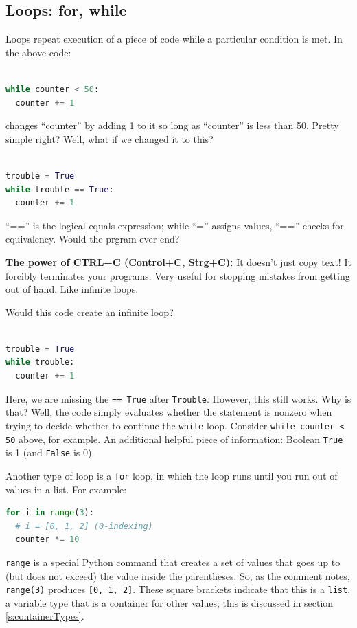 \documentclass[a4paper,10pt]{scrartcl}
\begin{document}
\subsection{Loops: for, while}
\label{s:loops}

Loops repeat execution of a piece of code while a particular condition is met. In the above code:
\begin{lstlisting}[belowskip=-1.6\baselineskip, language=python]

while counter < 50:
  counter += 1
\end{lstlisting}
changes ``counter'' by adding 1 to it so long as ``counter'' is less than 50. Pretty simple right? Well, what if we changed it to this?
\begin{lstlisting}[belowskip=-1.6\baselineskip, language=python]

trouble = True
while trouble == True:
  counter += 1
\end{lstlisting}
``=='' is the logical equals expression; while ``='' assigns values, ``=='' checks for equivalency. Would the prgram ever end?

\begin{framed}
\textbf{The power of CTRL+C (Control+C, Strg+C):} It doesn't just copy text! It forcibly terminates your programs. Very useful for stopping mistakes from getting out of hand. Like infinite loops.
\end{framed}

Would this code create an infinite loop?
\begin{lstlisting}[belowskip=-1.6\baselineskip, language=python]

trouble = True
while trouble:
  counter += 1
\end{lstlisting}
Here, we are missing the \lstinline{== True} after \lstinline{Trouble}. However, this still works. Why is that? Well, the code simply evaluates whether the statement is nonzero when trying to decide whether to continue the \lstinline{while} loop. Consider \lstinline{while counter < 50} above, for example. An additional helpful piece of information: Boolean \lstinline{True} is 1 (and \lstinline{False} is 0).

Another type of loop is a \lstinline{for} loop, in which the loop runs until you run out of values in a list. For example:
\begin{lstlisting}[belowskip=-1.6\baselineskip, language=python]
for i in range(3):
  # i = [0, 1, 2] (0-indexing)
  counter *= 10
\end{lstlisting}
\lstinline{range} is a special Python command that creates a set of values that goes up to (but does not exceed) the value inside the parentheses. So, as the comment notes, \lstinline{range(3)} produces \lstinline{[0, 1, 2]}. These square brackets indicate that this is a \lstinline{list}, a variable type that is a container for other values; this is discussed in section \ref{s:containerTypes}.
\end{document}
